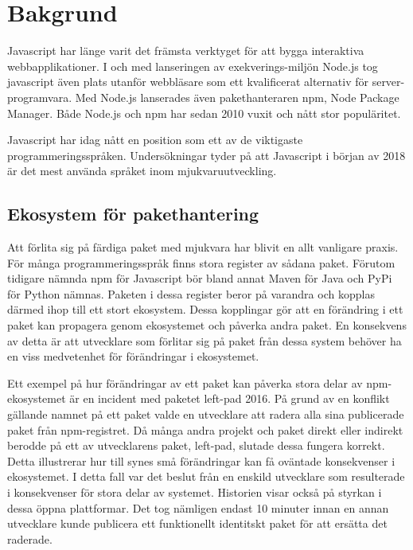 \section{Bakgrund}
\label{sec:joel_o-background}

Javascript har länge varit det främsta verktyget för att bygga interaktiva webbapplikationer. I och med lanseringen av exekverings-miljön Node.js tog javascript även plats utanför webbläsare som ett kvalificerat alternativ för server-programvara. Med Node.js lanserades även pakethanteraren npm, Node Package Manager. Både Node.js och npm har sedan 2010 vuxit och nått stor populäritet. \cite{node-timeline}

Javascript har idag nått en position som ett av de viktigaste programmeringsspråken. Undersökningar tyder på att Javascript i början av 2018 är det mest använda språket inom mjukvaruutveckling.\cite{githut}\cite{so-survey}

\subsection{Ekosystem för pakethantering}
Att förlita sig på färdiga paket med mjukvara har blivit en allt vanligare praxis. För många programmeringsspråk finns stora register av sådana paket. Förutom tidigare nämnda npm för Javascript bör bland annat Maven för Java och PyPi för Python nämnas. Paketen i dessa register beror på varandra och kopplas därmed ihop till ett stort ekosystem. Dessa kopplingar gör att en förändring i ett paket kan propagera genom ekosystemet och påverka andra paket. En konsekvens av detta är att utvecklare som förlitar sig på paket från dessa system behöver ha en viss medvetenhet för förändringar i ekosystemet.\cite{Henry2017}

Ett exempel på hur förändringar av ett paket kan påverka stora delar av npm-ekosystemet är en incident med paketet left-pad 2016. På grund av en konflikt gällande namnet på ett paket valde en utvecklare att radera alla sina publicerade paket från npm-registret. Då många andra projekt och paket direkt eller indirekt berodde på ett av utvecklarens paket, left-pad, slutade dessa fungera korrekt. Detta illustrerar hur till synes små förändringar kan få oväntade konsekvenser i ekosystemet. I detta fall var det beslut från en enskild utvecklare som resulterade i konsekvenser för stora delar av systemet. Historien visar också på styrkan i dessa öppna plattformar. Det tog nämligen endast 10 minuter innan en annan utvecklare kunde publicera ett funktionellt identitskt paket för att ersätta det raderade.\cite{npm-left-pad}

